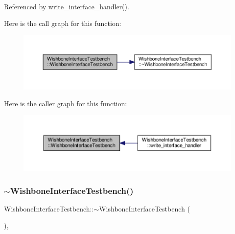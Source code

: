 Referenced by write\+\_\+interface\+\_\+handler().

Here is the call graph for this function\+:
\nopagebreak
\begin{figure}[H]
\begin{center}
\leavevmode
\includegraphics[width=350pt]{de/ded/classWishboneInterfaceTestbench_a7c6a2f55225f2d92dfca5d7921dff67e_cgraph}
\end{center}
\end{figure}
Here is the caller graph for this function\+:
\nopagebreak
\begin{figure}[H]
\begin{center}
\leavevmode
\includegraphics[width=350pt]{de/ded/classWishboneInterfaceTestbench_a7c6a2f55225f2d92dfca5d7921dff67e_icgraph}
\end{center}
\end{figure}
\mbox{\label{classWishboneInterfaceTestbench_ac5a3468a63abaf77f4c990558f2785ae}} 
\subsubsection{\texorpdfstring{$\sim$\+Wishbone\+Interface\+Testbench()}{~WishboneInterfaceTestbench()}}
{\footnotesize\ttfamily Wishbone\+Interface\+Testbench\+::$\sim$\+Wishbone\+Interface\+Testbench (\begin{DoxyParamCaption}{ }\end{DoxyParamCaption})\hspace{0.3cm}{\ttfamily [override]}, {\ttfamily [default]}}



